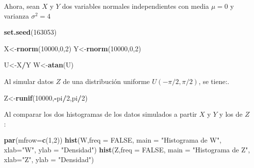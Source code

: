 \documentclass[]{article}
\newenvironment{Shaded}{\begin{snugshade}}{\end{snugshade}}
\newcommand{\KeywordTok}[1]{\textcolor[rgb]{0.13,0.29,0.53}{\textbf{#1}}}
\newcommand{\DataTypeTok}[1]{\textcolor[rgb]{0.13,0.29,0.53}{#1}}
\newcommand{\DecValTok}[1]{\textcolor[rgb]{0.00,0.00,0.81}{#1}}
\newcommand{\StringTok}[1]{\textcolor[rgb]{0.31,0.60,0.02}{#1}}
\newcommand{\OtherTok}[1]{\textcolor[rgb]{0.56,0.35,0.01}{#1}}
\newcommand{\OperatorTok}[1]{\textcolor[rgb]{0.81,0.36,0.00}{\textbf{#1}}}
\newcommand{\NormalTok}[1]{#1}
\begin{document}
Ahora, sean \(X\) y \(Y\) dos variables normales independientes con
media \(\mu=0\) y varianza \(\sigma^2=4\)

\begin{Shaded}
\begin{Highlighting}[]
\KeywordTok{set.seed}\NormalTok{(}\DecValTok{163053}\NormalTok{)}

\NormalTok{X<-}\KeywordTok{rnorm}\NormalTok{(}\DecValTok{10000}\NormalTok{,}\DecValTok{0}\NormalTok{,}\DecValTok{2}\NormalTok{)}
\NormalTok{Y<-}\KeywordTok{rnorm}\NormalTok{(}\DecValTok{10000}\NormalTok{,}\DecValTok{0}\NormalTok{,}\DecValTok{2}\NormalTok{)}

\NormalTok{U<-X}\OperatorTok{/}\NormalTok{Y}
\NormalTok{W<-}\KeywordTok{atan}\NormalTok{(U)}
\end{Highlighting}
\end{Shaded}

Al simular datos \(Z\) de una distribución uniforme \(U(-\pi/2,\pi/2)\),
se tiene:.

\begin{Shaded}
\begin{Highlighting}[]
\NormalTok{Z<-}\KeywordTok{runif}\NormalTok{(}\DecValTok{10000}\NormalTok{,}\OperatorTok{-}\NormalTok{pi}\OperatorTok{/}\DecValTok{2}\NormalTok{,pi}\OperatorTok{/}\DecValTok{2}\NormalTok{)}
\end{Highlighting}
\end{Shaded}

Al comparar los dos histogramas de los datos simulados a partir \(X\) y
\(Y\) y los de \(Z\):

\begin{Shaded}
\begin{Highlighting}[]
\KeywordTok{par}\NormalTok{(}\DataTypeTok{mfrow=}\KeywordTok{c}\NormalTok{(}\DecValTok{1}\NormalTok{,}\DecValTok{2}\NormalTok{))}
\KeywordTok{hist}\NormalTok{(W,}\DataTypeTok{freq =} \OtherTok{FALSE}\NormalTok{, }\DataTypeTok{main =} \StringTok{"Histograma de W"}\NormalTok{, }\DataTypeTok{xlab=}\StringTok{"W"}\NormalTok{, }\DataTypeTok{ylab =} \StringTok{"Densidad"}\NormalTok{)}
\KeywordTok{hist}\NormalTok{(Z,}\DataTypeTok{freq =} \OtherTok{FALSE}\NormalTok{, }\DataTypeTok{main =} \StringTok{"Histograma de Z"}\NormalTok{, }\DataTypeTok{xlab=}\StringTok{"Z"}\NormalTok{, }\DataTypeTok{ylab =} \StringTok{"Densidad"}\NormalTok{)}
\end{Highlighting}
\end{Shaded}
\end{document}
